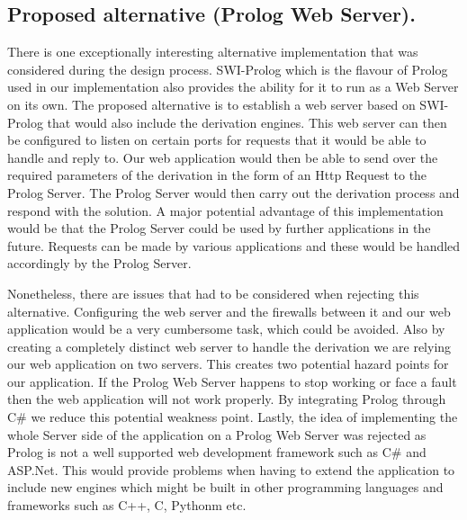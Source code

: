 \subsection{Proposed alternative (Prolog Web Server).}

There is one exceptionally interesting alternative implementation that was considered during the design process. SWI-Prolog which is the flavour of Prolog used in our implementation also provides the ability for it to run as a Web Server on its own. The proposed alternative is to establish a web server based on SWI-Prolog that would also include the derivation engines. This web server can then be configured to listen on certain ports for requests that it would be able to handle and reply to. Our web application would then be able to send over the required parameters of the derivation in the form of an Http Request to the Prolog Server. The Prolog Server would then carry out the derivation process and respond with the solution. A major potential advantage of this implementation would be that the Prolog Server could be used by further applications in the future. Requests can be made by various applications and these would be handled accordingly by the Prolog Server.

Nonetheless, there are issues that had to be considered when rejecting this alternative. Configuring the web server and the firewalls between it and our web application would be a very cumbersome task, which could be avoided. Also by creating a completely distinct web server to handle the derivation we are relying our web application on two servers. This creates two potential hazard points for our application. If the Prolog Web Server happens to stop working or face a fault then the web application will not work properly. By integrating Prolog through C\# we reduce this potential weakness point. Lastly, the idea of implementing the whole Server side of the application on a Prolog Web Server was rejected as Prolog is not a well supported web development framework such as C\# and ASP.Net. This would provide problems when having to extend the application to include new engines which might be built in other programming languages and frameworks such as C++, C, Pythonm etc.